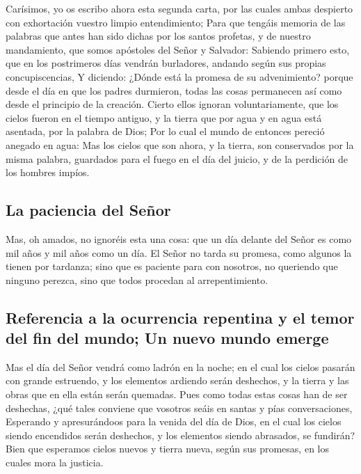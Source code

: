  Carísimos, yo os escribo ahora esta segunda carta, por
las cuales ambas despierto con exhortación vuestro limpio entendimiento;
 Para que tengáis memoria de las palabras que antes han
sido dichas por los santos profetas, y de nuestro mandamiento, que somos
apóstoles del Señor y Salvador:  Sabiendo primero esto,
que en los postrimeros días vendrán burladores, andando según sus
propias concupiscencias,  Y diciendo: ¿Dónde está la
promesa de su advenimiento? porque desde el día en que los padres
durmieron, todas las cosas permanecen así como desde el principio de la
creación.  Cierto ellos ignoran voluntariamente, que los
cielos fueron en el tiempo antiguo, y la tierra que por agua y en agua
está asentada, por la palabra de Dios;  Por lo cual el
mundo de entonces pereció anegado en agua:  Mas los cielos
que son ahora, y la tierra, son conservados por la misma palabra,
guardados para el fuego en el día del juicio, y de la perdición de los
hombres impíos.

\hypertarget{la-paciencia-del-seuxf1or}{%
\subsection{La paciencia del Señor}\label{la-paciencia-del-seuxf1or}}

 Mas, oh amados, no ignoréis esta una cosa: que un día
delante del Señor es como mil años y mil años como un día.
 El Señor no tarda su promesa, como algunos la tienen por
tardanza; sino que es paciente para con nosotros, no queriendo que
ninguno perezca, sino que todos procedan al arrepentimiento.

\hypertarget{referencia-a-la-ocurrencia-repentina-y-el-temor-del-fin-del-mundo-un-nuevo-mundo-emerge}{%
\subsection{Referencia a la ocurrencia repentina y el temor del fin del
mundo; Un nuevo mundo
emerge}\label{referencia-a-la-ocurrencia-repentina-y-el-temor-del-fin-del-mundo-un-nuevo-mundo-emerge}}

 Mas el día del Señor vendrá como ladrón en la noche; en
el cual los cielos pasarán con grande estruendo, y los elementos
ardiendo serán deshechos, y la tierra y las obras que en ella están
serán quemadas.  Pues como todas estas cosas han de ser
deshechas, ¿qué tales conviene que vosotros seáis en santas y pías
conversaciones,  Esperando y apresurándoos para la venida
del día de Dios, en el cual los cielos siendo encendidos serán
deshechos, y los elementos siendo abrasados, se fundirán?
 Bien que esperamos cielos nuevos y tierra nueva, según
sus promesas, en los cuales mora la justicia.

